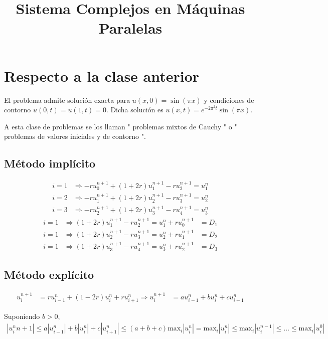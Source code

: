 \documentclass[a4paper]{article}
\title{Sistema Complejos en Máquinas Paralelas}
\begin{document}
\maketitle


\section{Respecto a la clase anterior}

El problema admite solución exacta para $u(x, 0) = \sin(\pi x)$ y condiciones de
contorno $u(0, t) = u(1, t) = 0$. Dicha solución es $u(x, t) = e^{-2\pi^2 t}\sin(\pi x)$.

A esta clase de problemas se los llaman " problemas mixtos de Cauchy " o " problemas
de valores iniciales y de contorno ".


\subsection{Método implícito}

\begin{align*}
  i = 1 &\Rightarrow -ru_0^{n+1} + (1 + 2r)u_1^{n+1} - ru_2^{n+1} = u_1^n \\
  i = 2 &\Rightarrow -ru_1^{n+1} + (1 + 2r)u_2^{n+1} - ru_3^{n+1} = u_2^n \\
  i = 3 &\Rightarrow -ru_2^{n+1} + (1 + 2r)u_3^{n+1} - ru_4^{n+1} = u_3^n
\end{align*}
\begin{align*}
  i = 1 &\Rightarrow (1 + 2r)u_1^{n+1} - ru_2^{n+1} = u_1^n + ru_0^{n+1} &= D_1 \\
  i = 1 &\Rightarrow (1 + 2r)u_2^{n+1} - ru_3^{n+1} = u_2^n + ru_1^{n+1} &= D_2 \\
  i = 1 &\Rightarrow (1 + 2r)u_3^{n+1} - ru_4^{n+1} = u_3^n + ru_2^{n+1} &= D_3
\end{align*}


\subsection{Método explícito}

\begin{align*}
  u_i^{n+1} &= r u_{i-1}^n + (1 - 2r) u_i^n + r u_{i+1}^n \Rightarrow
  u_i^{n+1} &= a u_{i-1}^n + b u_i^n + c u_{i+1}^n
\end{align*}

Suponiendo $b > 0$,
\begin{align*}
  |u_i^n{n+1}| \leq a |u_{i-1}^n| + b |u_i^n| + c |u_{i+1}^n|
               \leq (a + b + c) \text{max}_i |u_i^n|
               = \text{max}_i |u_i^n|
               \leq \text{max}_i |u_i^{n-1}|
               \leq \dots
               \leq \text{max}_i |u_i^0|
\end{align*}
\end{document}
